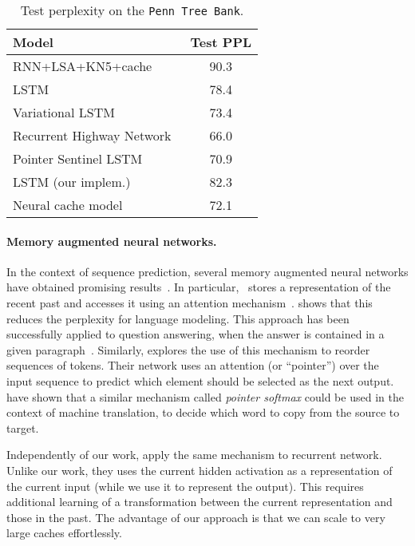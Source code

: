 \documentclass{article} \usepackage{iclr2017_conference,times}
\begin{document}
\begin{table}
  \small
  \centering
  \begin{tabular}{lc}
    \toprule
    Model & Test PPL \\
    \midrule
    RNN+LSA+KN5+cache~\citep{mikolov2012context}         & 90.3 \\
    LSTM~\citep{zaremba2014recurrent}                    & 78.4 \\
    Variational LSTM~\citep{gal2015theoretically}        & 73.4 \\
    Recurrent Highway Network~\citep{zilly2016recurrent} & 66.0 \\ Pointer Sentinel LSTM~\citep{merity2016pointer}      & 70.9 \\
    \midrule
    LSTM (our implem.)                                   & 82.3 \\
    Neural cache model                                   & 72.1 \\
    \bottomrule
  \end{tabular}
  \caption{Test perplexity on the \texttt{Penn Tree Bank}.}
  \label{tab:ptb}
\end{table}

\paragraph{Memory augmented neural networks.} 
In the context of sequence prediction, 
several memory augmented neural networks have obtained promising
results~\citep{sukhbaatar2015end,graves2014neural,grefenstette2015learning,joulin2015inferring}.
In particular,~\citet{sukhbaatar2015end} stores a representation of the 
recent past and accesses it using an attention mechanism~\cite{bahdanau2014neural}.
\citet{sukhbaatar2015end} shows that this reduces the perplexity for language
modeling.  This approach has been successfully applied to question
answering, when the answer is contained in a given
paragraph~\citep{chen2016thorough,hermann2015teaching,kadlec2016text,sukhbaatar2015end}.
Similarly, \citet{vinyals2015pointer} explores the use of this mechanism to
reorder sequences of tokens. Their network uses an attention (or ``pointer'')
over the input sequence to predict which element should be selected as the next
output.  \citet{gulcehre2016pointing} have shown that a similar mechanism
called \emph{pointer softmax} could be used in the context of machine
translation,  to decide which word to copy from the source to target.  

Independently of our work, \citet{merity2016pointer} apply the same mechanism
to recurrent network. Unlike our work, they uses the current hidden activation
as a representation of the current input (while we use it to represent the
    output). This requires additional learning of a transformation between the current
representation and those in the past. The advantage of our
approach is that we can scale to very large caches effortlessly. 
 
\end{document}
